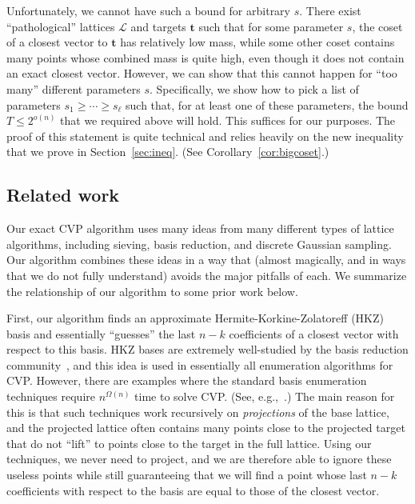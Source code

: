 \documentclass[11pt]{article}
\renewcommand{\vec}[1]{\ensuremath{\mathbf{#1}}}
\newcommand{\problem}[1]{\mbox{#1}\xspace}
\newcommand{\scarequotes}[1]{``#1''}
\newcommand{\lat}{\mathcal{L}}
\begin{document}
Unfortunately, we cannot have such a bound for arbitrary $s$. There exist \scarequotes{pathological} lattices $\lat$ and targets $\vec{t}$ such that for some parameter $s$, the coset of a closest vector to $\vec{t}$ has relatively low mass, while some other coset contains many points whose combined mass is quite high, even though it does not contain an exact closest vector. However, we can show that this cannot happen for \scarequotes{too many} different parameters $s$. Specifically, we show how to pick a list of parameters $s_1 \geq \cdots \geq s_\ell$ such that, for at least one of these parameters, the bound $T \leq 2^{o(n)}$ that we required above will hold. This suffices for our purposes. The proof of this statement is quite technical and relies heavily on the new inequality that we prove in Section~\ref{sec:ineq}. (See Corollary~\ref{cor:bigcoset}.)

\subsection{Related work}

Our exact \problem{CVP} algorithm uses many ideas from many different types of lattice algorithms, including sieving, basis reduction, and discrete Gaussian sampling. Our algorithm combines these ideas in a way that (almost magically, and in ways that we do not fully understand) avoids the major pitfalls of each. We summarize the relationship of our algorithm to some prior work below.

First, our algorithm finds an approximate Hermite-Korkine-Zolatoreff (HKZ) basis and essentially \scarequotes{guesses} the last $n-k$ coefficients of a closest vector with respect to this basis.
HKZ bases are extremely well-studied by the basis reduction
community~\cite{Kan87,Helfrich86,lagarias90,HanrotStehle07,MicciancioWalter15},
and this idea is used in essentially all enumeration algorithms for \problem{CVP}. 
However, there are examples where the standard basis enumeration
techniques require $n^{\Omega(n)}$ time to solve CVP. (See, e.g.,~\cite{BGJ14}.) 
The main reason for this is that such 
techniques work recursively on \emph{projections} of the base lattice, and the projected lattice often contains many points close to the
projected target that do not \scarequotes{lift} to points close to the target in the
full lattice. Using our techniques, we never need to project, and we are therefore able to ignore these useless
points while still guaranteeing that we will find a point whose last
 $n-k$ coefficients with respect to the basis are equal
to those of the closest vector.
\end{document}
